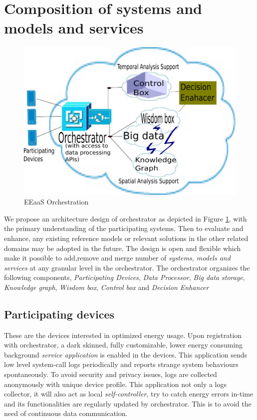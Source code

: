 \section{Composition of systems and models and services}
\begin{figure}[h]
 \begin{center}
 \includegraphics[scale=0.30]{Figures/EEaaOSArchEnhanced.png}
 \end{center}
 \caption{EEaaS Orchestration}
 \label{fig:Orch}
\end{figure}

We propose an architecture design of orchestrator as depicted in Figure \ref{fig:Orch}, with the primary understanding of the participating systems. Then to evaluate and enhance, any existing reference models or relevant solutions in the other related domains may be adopted in the future. The design is open and flexible which make it possible to add,remove and merge number of \textit{systems, models and services} at any granular level in the orchestrator. The orchestrator organizes the following components, \emph{Participating Devices}, \emph{Data Processor}, \emph{Big data storage}, \emph{Knowledge graph}, \emph{Wisdom box}, \emph{Control box} and  \emph{Decision Enhancer} %
\subsection{Participating devices}
\label{section:partdevice}
These are the devices interested in optimized energy usage. Upon registration with orchestrator, a dark skinned, fully customizable, lower energy consuming background \textit{service application} is enabled in the devices. This application sends low level system-call logs periodically and reports strange system behaviours spontaneously. To avoid security and privacy issues, logs are collected anonymously with unique device profile. This application not only a logs collector, it will also act as local \textit{self-controller}, try to catch energy errors in-time and its functionalities are regularly updated by orchestrator. This is to avoid the need of continuous data communication. 
